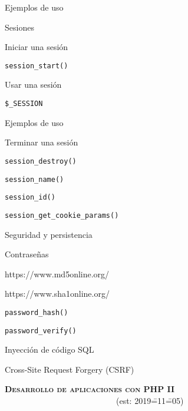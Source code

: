 \begin{longenum}
\begin{longenum}
\begin{longenum}
            \item Ejemplos de uso
        \end{longenum}
        \item Sesiones
        \begin{longenum}
            \item Iniciar una sesión
            \begin{longenum}
                \item \texttt{session\_start()}
            \end{longenum}
            \item Usar una sesión
            \begin{longenum}
                \item \texttt{\$\_SESSION}
                \item Ejemplos de uso
            \end{longenum}
            \item Terminar una sesión
            \begin{longenum}
                \item \texttt{session\_destroy()}
                \item \texttt{session\_name()}
                \item \texttt{session\_id()}
                \item \texttt{session\_get\_cookie\_params()}
            \end{longenum}
        \end{longenum}
        \item Seguridad y persistencia
        \begin{longenum}
            \item Contraseñas
            \begin{longenum}
                \item https://www.md5online.org/
                \item https://www.sha1online.org/
                \item \texttt{password\_hash()}
                \item \texttt{password\_verify()}
            \end{longenum}
            \item Inyección de código SQL
            \item Cross-Site Request Forgery (CSRF)
        \end{longenum}
    \end{longenum}
    \item \textbf{\textsc{Desarrollo de aplicaciones con PHP II}} \ \ \ \ \ \ \ \ \ \ \ \ \ \ \ \ \ \ \ \ \ \ \ \ \ \ \ (est: 2019\==11\==05)

\end{longenum}
